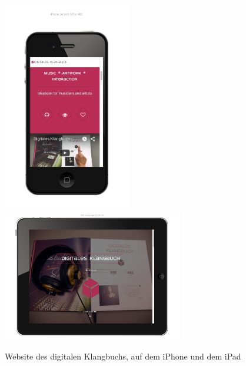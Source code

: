 \begin{figure}[H]
\centering
\caption{Website des digitalen Klangbuchs, auf dem iPhone und dem iPad}
\includegraphics[width=0.5\textwidth]{100_anhang/website-iphone.png}
\includegraphics[width=0.7\textwidth]{100_anhang/website-ipadlandscape.png}
\end{figure}
